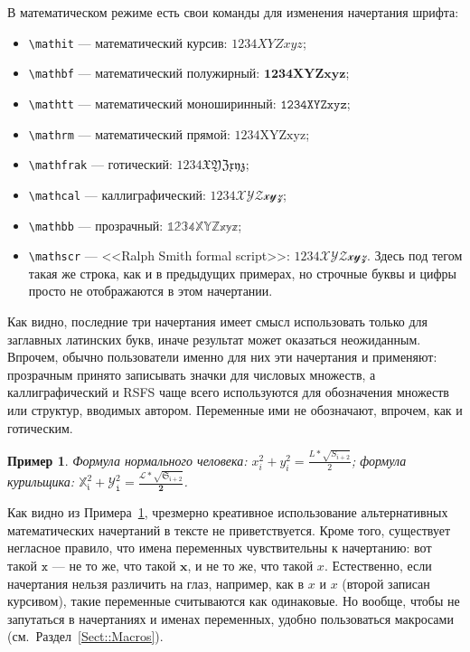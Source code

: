 \documentclass[14pt, russian]{scrartcl}
\newcounter{cExample}
\newtheorem{Example}{Пример}[cExample]
\begin{document}
В математическом режиме есть свои команды для изменения начертания шрифта:
\begin{itemize}
\item \texttt{\textbackslash mathit} --- математический курсив: $\mathit{1234XYZxyz}$;
\item \texttt{\textbackslash mathbf} --- математический полужирный: $\mathbf{1234XYZxyz}$;
\item \texttt{\textbackslash mathtt} --- математический моноширинный: $\mathtt{1234XYZxyz}$; 
\item \texttt{\textbackslash mathrm} --- математический прямой: $\mathrm{1234XYZxyz}$; 
\item \texttt{\textbackslash mathfrak} --- готический: $\mathfrak{1234XYZxyz}$; 
\item \texttt{\textbackslash mathcal} --- каллиграфический: $\mathcal{1234XYZxyz}$; 
\item \texttt{\textbackslash mathbb} --- прозрачный: $\mathbb{1234XYZxyz}$;
\item \texttt{\textbackslash mathscr} --- <<Ralph Smith formal script>>: $\mathscr{1234XYZxyz}$. Здесь под тегом такая же строка, как и в предыдущих примерах, но строчные буквы и цифры просто не отображаются в этом начертании.
\end{itemize}
Как видно, последние три начертания имеет смысл использовать только для заглавных латинских букв, иначе результат может оказаться неожиданным. Впрочем, обычно пользователи именно для них эти начертания и применяют: прозрачным принято записывать значки для числовых множеств, а каллиграфический и RSFS чаще всего используются для обозначения множеств или структур, вводимых автором. Переменные ими не обозначают, впрочем, как и готическим.

\begin{Example}\label{Example:MathFont}
Формула нормального человека: $x_i^2 + y^2_i = \frac{L*\sqrt{S_{i+2}}}{2}$; формула курильщика: $\mathbb{X}_\mathfrak{i}^\mathfrak{2} + \mathcal{Y}^\mathit{2}_\mathtt{i} = \frac{\mathscr{L}*\sqrt{\mathfrak{S}_\mathfrak{i+2}}}{\mathbf{2}}$.
\end{Example} 

Как видно из Примера~\ref{Example:MathFont}, чрезмерно креативное использование альтернативных математических начертаний в тексте не приветствуется. Кроме того, существует негласное правило, что имена переменных чувствительны к начертанию: вот такой $\mathtt{x}$ --- не то же, что такой $\mathbf{x}$, и не то же, что такой $x$. Естественно, если начертания нельзя различить на глаз, например, как в $x$ и $\mathit{x}$ (второй записан курсивом), такие переменные считываются как одинаковые. Но вообще, чтобы не запутаться в начертаниях и именах переменных, удобно пользоваться макросами (см.~Раздел~\ref{Sect::Macros}).
\end{document}
